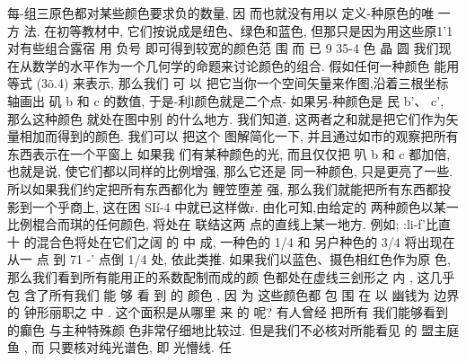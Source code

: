 \documentclass[11pt,oneside]{book}
\begin{document}
\begin{common-format}
{每-组三原色都对某些颜色要求负的数量, 因 而也就没有用以 定义-种原色的唯 一 方 法.
在初等教材中, 它们按说成是纽色、绿色和蓝色, 但那只是因为用这些原1'1对有些组合露宿
用 负号 即可得到较宽的颜色范 围 而 已
9 35-4 色 晶 圆
我们现在从数学的水平作为一个几何学的命题来讨论颜色的组合. 假如任何一种颜色
能用等式 (3õ.4) 来表示, 那么我们 可 以 把它当你一个空间矢量来作图,沿着三根坐标轴画出
矶 b 和 c 的数值, 于是-利l颜色就是二个点-
如果另-种颜色是 民 b'、 c', 那么这种颜色
就处在图中别 的什么地方. 我们知道, 这两者之和就是把它们作为矢量相加而得到的颜色.
我们可以 把这个 图解简化一下, 并且通过如市的观察把所有东西表示在一个平窗上 如果我
们有某种颜色的光, 而且仅仅把 叭 b 和 c 都加倍, 也就是说, 使它们都以同样的比例增强,
那么它还是 同一种颜色, 只是更亮了一些. 所以如果我们约定把所有东西都化为 鲤笠堕差
强, 那么我们就能把所有东西都投影到一个乎商上,
这在困 SIí-4 中就已这样做r. 由化可知,由给定的
两种颜色以某一比例棍合而琪的任何颜色, 将处在
联结这两 点的直线上某一地方.
例如; :li-f'比直十
的混合色将处在它们之阔 的 中 成, 一种色的 1/4 和
另户种色的 3/4 将出现在从一 点 到 71 -' 点倒 1/4
处, 依此类推. 如果我们以蓝色、摄色相红色作为原
色, 那么我们看到所有能用正的系数配制而成的颜
色都处在虚线三刽形之 内 , 这几乎包 含了所有我们
能 够 看 到 的 颜色 , 因 为 这些颜色都 包 围 在 以 幽钱为
边界的 钟形丽职之 中 . 这个面积是从哪里 来 的 呢?
有人曾经 把所有 我们能够看到的癫色 与主种特殊颜
色非常仔细地比较过. 但是我们不必核对所能看见
的 盟主庭鱼 , 而 只要核对纯光谱色, 即 光懵线. 任


}
\end{common-format}
\end{document}
